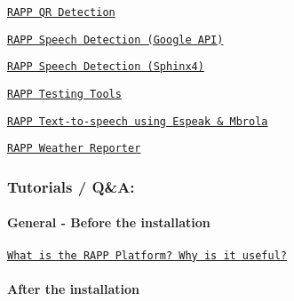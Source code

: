 \begin{DoxyItemize}
\item \href{https://github.com/rapp-project/rapp-platform/wiki/RAPP-QR-Detection}{\tt R\-A\-P\-P Q\-R Detection}
\item \href{https://github.com/rapp-project/rapp-platform/wiki/RAPP-Speech-Detection-using-Google-API}{\tt R\-A\-P\-P Speech Detection (Google A\-P\-I)}
\item \href{https://github.com/rapp-project/rapp-platform/wiki/RAPP-Speech-Detection-using-Sphinx4}{\tt R\-A\-P\-P Speech Detection (Sphinx4)}
\item \href{https://github.com/rapp-project/rapp-platform/wiki/RAPP-Testing-Tools}{\tt R\-A\-P\-P Testing Tools}
\item \href{https://github.com/rapp-project/rapp-platform/wiki/RAPP-Text-to-speech-using-Espeak-&-Mbrola}{\tt R\-A\-P\-P Text-\/to-\/speech using Espeak \& Mbrola}
\item \href{https://github.com/rapp-project/rapp-platform/wiki/RAPP-Weather-Reporter}{\tt R\-A\-P\-P Weather Reporter}
\end{DoxyItemize}

\subsubsection*{Tutorials / Q\&A\-:}

\paragraph*{General -\/ Before the installation}


\begin{DoxyItemize}
\item \href{https://github.com/rapp-project/rapp-platform/wiki/What-is-the-RAPP-Platform%3F-Why-is-it-useful%3F}{\tt What is the R\-A\-P\-P Platform? Why is it useful?}
\end{DoxyItemize}

\paragraph*{After the installation}


